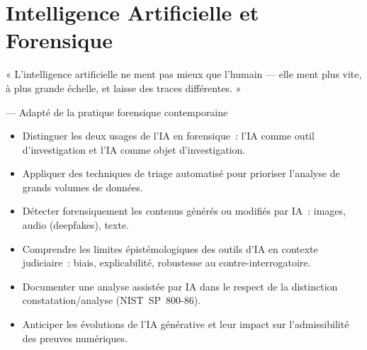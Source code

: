 
\chapter{Intelligence Artificielle et Forensique}
\label{chap:ia-for}

\epigraph{%
    « L'intelligence artificielle ne ment pas mieux que l'humain ---
    elle ment plus vite, à plus grande échelle, et laisse des traces
    différentes. »%
}{--- Adapté de la pratique forensique contemporaine}


\begin{boxobjectifs}
\begin{itemize}
    \item Distinguer les deux usages de l'IA en forensique~: l'IA
          comme outil d'investigation et l'IA comme objet d'investigation.
    \item Appliquer des techniques de triage automatisé pour
          prioriser l'analyse de grands volumes de données.
    \item Détecter forensiquement les contenus générés ou modifiés
          par IA~: images, audio (deepfakes), texte.
    \item Comprendre les limites épistémologiques des outils d'IA
          en contexte judiciaire~: biais, explicabilité, robustesse
          au contre-interrogatoire.
    \item Documenter une analyse assistée par IA dans le respect
          de la distinction constatation/analyse (NIST~SP~800-86).
    \item Anticiper les évolutions de l'IA générative et leur
          impact sur l'admissibilité des preuves numériques.
\end{itemize}
\end{boxobjectifs}

